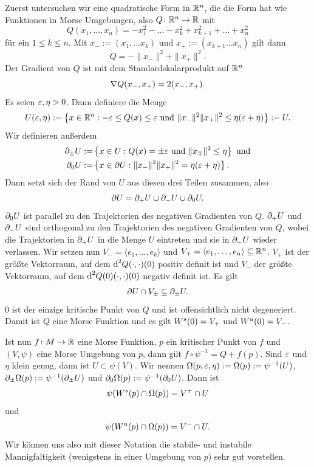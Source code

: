 \begin{definition}
    \label{def: notation morse umgebung}
    Zuerst untersuchen wir eine quadratische Form in ${ \mathbb R }^n$, die die Form hat wie Funktionen in Morse
    Umgebungen, also $Q \colon { \mathbb R }^n \to { \mathbb R }$ mit
    \[ Q(x_1, \dots, x_n) = - x_1^2 - \dots - x_k^2 + x_{k + 1}^2 + \dots + x_n^2 \]
    für ein $1 \leq k \leq n$.
    Mit $x_- := (x_1, \dots x_k)$ und $x_+ := (x_{k + 1} \dots x_n)$ gilt dann
    \[ Q = - \| x_- \|^2 + \| x_+ \|^2 . \]
    Der Gradient von $Q$ ist mit dem Standardskalarprodukt auf ${ \mathbb R }^n$
    \[ { \nabla } Q (x_-, x_+) = 2(x_-, x_+) . \]
    Es seien $\varepsilon, \eta > 0$. Dann definiere die Menge
    \[ U(\varepsilon, \eta) := \left\{ x \in { \mathbb R }^n : - \varepsilon \leq Q(x) \leq \varepsilon 
    \text{ und } \| x_- \|^2 \| x_+ \|^2 \leq \eta(\varepsilon + \eta) \right\} := U . \]
    Wir definieren außerdem
    \begin{align*}
        { \partial }_{\pm} U := & \left\{ x \in U: Q(x) = \pm \varepsilon \text{ und } \|x_{\mp} \|^2 \leq \eta \right\} 
            \text{ und} \\
        { \partial }_0 U := & \left\{ x \in { \partial } U: \| x_- \|^2 \| x_+ \|^2 = \eta(\varepsilon + \eta) \right\} .
    \end{align*}
    Dann setzt sich der Rand von $U$ aus diesen drei Teilen zusammen, also
    \[ { \partial } U = { \partial }_+ U \cup { \partial }_- U \cup { \partial }_0 U . \]
    ${ \partial }_0 U$ ist parallel zu den Trajektorien des negativen Gradienten von $Q$. ${ \partial }_+ U$ und 
    ${ \partial }_- U$ sind orthogonal zu den Trajektorien des negativen Gradienten von $Q$, wobei die 
    Trajektorien in ${ \partial }_+ U$ in die Menge $U$ eintreten und sie in ${ \partial }_- U$ wieder verlassen. 
    Wir setzen nun $V_- = \langle e_1, \dots, e_k \rangle$ und 
    $V_+ = \langle e_1, \dots, e_n \rangle \subseteq { \mathbb R }^n$. $V_+$ ist der größte Vektorraum, 
    auf dem ${ \operatorname{d} }^2 Q (\cdot, \cdot) (0)$ positiv definit ist und $V_-$ der größte Vektorraum, auf dem 
    ${ \operatorname{d} }^2 Q (0) (\cdot, \cdot) (0)$ negativ definit ist. 
    Es gilt 
    \[ { \partial } U \cap V_{\pm} \subseteq { \partial }_{\pm} U . \]
    $0$ ist der einzige kritische Punkt von $Q$ und ist offensichtlich nicht degeneriert. Damit ist $Q$
    eine Morse Funktion und es gilt 
    ${ W^s } (0) = V_+$ und ${ W^u } (0) = V_-$.

    Ist nun $f \colon M \to { \mathbb R }$ eine Morse Funktion, $p$ ein kritischer Punkt von $f$ und $(V, \psi)$
    eine Morse Umgebung von $p$, dann gilt $f \circ \psi^{-1} = Q + f(p)$. Sind $\varepsilon$ und $\eta$
    klein genug, dann ist $U \subset \psi(V)$. Wir nennen 
    $\Omega (p, \varepsilon, \eta) := \Omega (p) := \psi^{-1}(U)$, 
    ${ \partial }_{\pm} \Omega (p) := \psi^{-1}({ \partial }_{\pm}U)$ und ${ \partial }_0 \Omega (p) := \psi^{-1} ({ \partial }_0 U)$.
    Dann ist 
    \[ \psi({ W^s } (p) \cap \Omega (p)) = V^+ \cap U \] 
    und 
    \[ \psi({ W^u } (p) \cap \Omega (p)) = V^- \cap U . \]
    Wir können uns also mit dieser Notation die stabile- und instabile Mannigfaltigkeit (wenigstens 
    in einer Umgebung von $p$) sehr gut vorstellen.


\end{definition}
